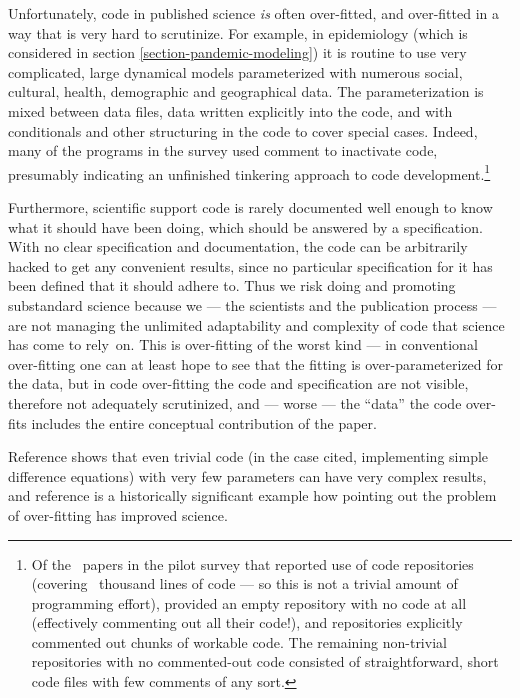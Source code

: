 Unfortunately, code in published science \emph{is\/} often over-fitted, and over-fitted in a way that is very hard to scrutinize. For example, in epidemiology (which is considered in section \ref{section-pandemic-modeling}) it is routine to use very complicated, large dynamical models parameterized with numerous social, cultural, health, demographic and geographical data. The parameterization is mixed between data files, data written explicitly into the code, and with conditionals and other structuring in the code to cover special cases. Indeed, many of the programs in the survey used comment to inactivate code, presumably indicating an unfinished tinkering approach to code development.\footnote{Of the \the\countRepos\ papers in the pilot survey that reported use of code repositories (covering 
\totalkLOC\ thousand lines of code --- so this is not a trivial amount of programming effort), \numbertoname{\the\countMissingCode} provided an empty repository with no code at all (effectively commenting out all their code!), and \numbertoname{\the\countCommentedOut} repositories explicitly commented out chunks of workable code. The \numbertoname{\the\countNotCommentedOut} remaining non-trivial repositories with no commented-out code consisted of straightforward, short code files with few comments of any sort.}

Furthermore, scientific support code is rarely documented well enough to know what it should have been doing, which should be answered by a specification. With no clear specification and documentation, the code can be arbitrarily hacked to get any convenient results, since no particular specification for it has been defined that it should adhere to. Thus we risk doing and promoting substandard science because we --- the scientists and the publication process --- are not managing the unlimited adaptability and complexity of code that science has come to rely~on. This is over-fitting of the worst kind --- in conventional over-fitting one can at least hope to see that the fitting is over-parameterized for the data, but in code over-fitting the code and specification are not visible, therefore not adequately scrutinized, and --- worse --- the ``data'' the code over-fits includes the entire conceptual contribution of the paper. 

Reference \cite{may-simple} shows that even trivial code (in the case cited, implementing simple difference equations) with very few parameters can have very complex results, and reference \cite{dyson} is a historically significant example how pointing out the problem of over-fitting has improved science.

